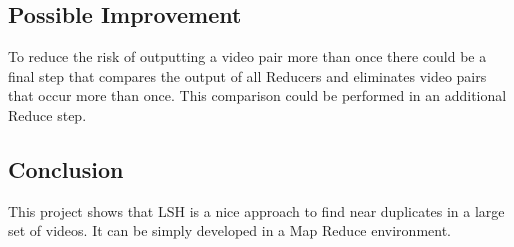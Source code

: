 \documentclass[a4paper, 11pt]{article}
\begin{document}
\subsection{Possible Improvement}

To reduce the risk of outputting a video pair more than once there could be a final
step that compares the output of all Reducers and eliminates video pairs that occur more than once. This comparison could be performed in an additional Reduce step.

\subsection{Conclusion}

This project shows that LSH is a nice approach to find near duplicates in a large set
of videos. It can be simply developed in a Map Reduce environment.
\end{document}
